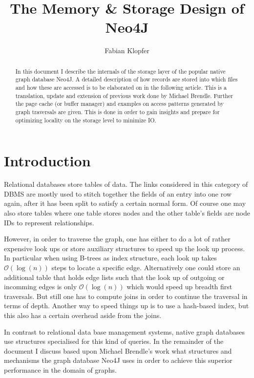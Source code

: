 \documentclass[a4paper,10pt]{article}
\title{The Memory \& Storage Design of Neo4J}
\author{Fabian Klopfer}
\begin{document}
\maketitle
\vspace{2cm}

\begin{abstract}
In this document I describe the internals of the storage layer of the popular native graph database Neo4J. A detailed description of how records are stored into which files and how these are accessed is to be elaborated on in the following article. This is a translation, update and extension of previous work done by Michael Brendle. Further the page cache (or buffer manager) and examples on access patterns generated by graph traversals are given. This is done in order to gain insights and prepare for optimizing locality on the storage level to minimize IO.
\end{abstract} \newpage

\tableofcontents \newpage

\section{Introduction}
Relational databases store tables of data. The links considered in this category of DBMS are mostly used to stitch together the fields of an entry into one row again, after it has been split to satisfy a certain normal form. Of course one may also store tables where one table stores nodes and the other table's fields are node IDs to represent relationships.

However, in order to traverse the graph, one has either to do a lot of rather expensive look ups or store auxiliary structures to speed up the look up process. In particular when using B-trees as index structure, each look up takes $\mathcal{O}(\log(n))$ steps to locate a specific edge. Alternatively one could store an additional table that holds edge lists such that the look up of outgoing or incomming edges is only $\mathcal{O}(\log(n))$ which would speed up breadth first traversals. But still one has to compute joins in order to continue the traversal in terms of depth. Another way to speed things up is to use a hash-based index, but this also has a certain overhead aside from the joins.

In contrast to relational data base management systems, native graph data\-bases use structures specialised for this kind of queries. In the remainder of the document I discuss based upon Michael Brendle's work what structures and mechanisms the graph database Neo4J uses in order to achieve this superior performance in the domain of graphs.
\end{document}
